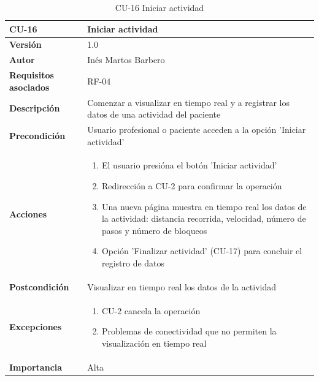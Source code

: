 \begin{table}[p]
	\centering
	\begin{tabularx}{\linewidth}{ p{} p{} }
		\toprule
		\textbf{CU-16}    & \textbf{Iniciar actividad}\\
		\toprule
		\textbf{Versión}              & 1.0    \\
		\textbf{Autor}                & Inés Martos Barbero \\
		\textbf{Requisitos asociados} & RF-04 \\
		\textbf{Descripción}          & Comenzar a visualizar en tiempo real y a registrar los datos de una actividad del paciente \\
		\textbf{Precondición}         & Usuario profesional o paciente acceden a la opción 'Iniciar actividad' \\
		\textbf{Acciones}             &
		\begin{enumerate}
			\def\labelenumi{\arabic{enumi}.}
			\tightlist
			\item El usuario presióna el botón 'Iniciar actividad'
			\item Redirección a CU-2 para confirmar la operación
            \item Una nueva página muestra en tiempo real los datos de la actividad: distancia recorrida, velocidad, número de pasos y número de bloqueos
            \item Opción 'Finalizar actividad' (CU-17) para concluir el registro de datos
		\end{enumerate}\\
		\textbf{Postcondición}        & Visualizar en tiempo real los datos de la actividad \\
		\textbf{Excepciones}          & 
        \begin{enumerate}
			\def\labelenumi{\arabic{enumi}.}
			\tightlist
			\item CU-2 cancela la operación
			\item Problemas de conectividad que no permiten la visualización en tiempo real
		\end{enumerate}\\
		\textbf{Importancia}          & Alta \\
		\bottomrule
	\end{tabularx}
	\caption{CU-16 Iniciar actividad}
    \label{CU-16}
\end{table}

